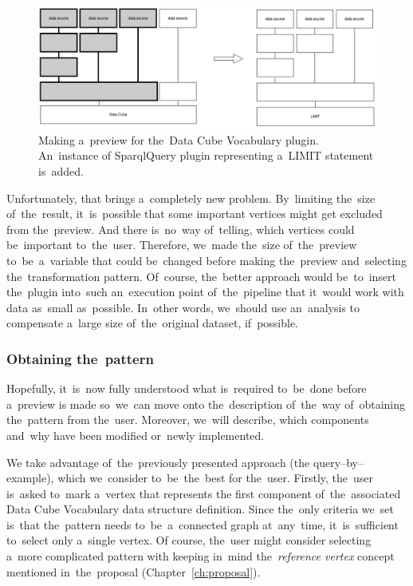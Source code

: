 \begin{figure}
	\centering
	\includegraphics[width=140mm]{img/dcv-extraction-limit.png}
	\caption{Making a~preview for the~Data Cube Vocabulary plugin. An~instance of
	SparqlQuery plugin representing a~LIMIT statement is~added.}
	\label{fig:dcv-extraction-limit}
\end{figure}

Unfortunately, that brings a~completely new problem. By~limiting the~size of~the~result, it~is~possible that some important vertices might get excluded from the~preview.
And there is~no~way of~telling, which vertices could be~important to~the~user. Therefore, we~made the~size of~the~preview to~be~a~variable that could be~changed before making the~preview and~selecting the~transformation pattern. Of~course, the~better approach would be~to~insert the~plugin into~such an~execution point of~the~pipeline that it~would 
work with data as~small as~possible. In~other words, we~should use an~analysis 
to compensate a~large size of~the~original dataset, if~possible.



\subsubsection{Obtaining the~pattern}
Hopefully, it~is~now fully understood what is~required to~be~done before a~preview 
is made so~we~can move onto the~description of~the~way of~obtaining the~pattern 
from the~user. Moreover, we~will describe, which components and~why have been 
modified or~newly implemented.

\begin{sloppypar}
We take advantage of~the~previously presented approach (the query--by--example), which we~consider to~be~the~best for the~user. Firstly, the~user is~asked to~mark a~vertex that represents
the first component of~the~associated Data Cube Vocabulary data structure 
definition. Since the~only criteria we~set is~that the~pattern needs to~be~a~connected graph at~any~time, it~is~sufficient to~select only a~single vertex.
Of course, the~user might consider selecting a~more complicated pattern with keeping in~mind the~\emph{reference vertex} concept mentioned in~the~proposal (Chapter~\ref{ch:proposal}).
\end{sloppypar}


